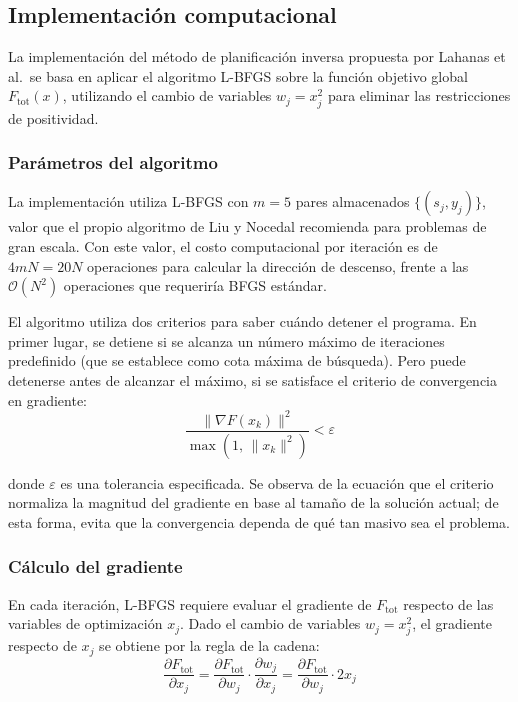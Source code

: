 \subsection{Implementación computacional}

La implementación del método de planificación inversa propuesta por Lahanas et al.\ se basa en aplicar el algoritmo L-BFGS sobre la función objetivo global \(F_{\text{tot}}(x)\), utilizando el cambio de variables \(w_j = x_j^2\) para eliminar las restricciones de positividad.

\subsubsection*{Parámetros del algoritmo}

La implementación utiliza L-BFGS con \(m = 5\) pares almacenados \(\{(s_j, y_j)\}\), valor que el propio algoritmo de Liu y Nocedal recomienda para problemas de gran escala. Con este valor, el costo computacional por iteración es de \(4mN = 20N\) operaciones para calcular la dirección de descenso, frente a las \(\mathcal{O}(N^2)\) operaciones que requeriría BFGS estándar.

El algoritmo utiliza dos criterios para saber cuándo detener el programa. En primer lugar, se detiene si se alcanza un número máximo de iteraciones predefinido (que se establece como cota máxima de búsqueda). Pero puede detenerse antes de alcanzar el máximo, si se satisface el criterio de convergencia en gradiente:
\[
\frac{\|\nabla F(x_k)\|^2}{\max(1,\,\|x_k\|^2)}
<
\varepsilon
\]

donde \(\varepsilon\) es una tolerancia especificada. Se observa de la ecuación que el criterio normaliza la magnitud del gradiente en base al tamaño de la solución actual; de esta forma, evita que la convergencia dependa de qué tan masivo sea el problema.

\subsubsection*{Cálculo del gradiente}
 
En cada iteración, L-BFGS requiere evaluar el gradiente de \(F_{\text{tot}}\) respecto de las variables de optimización \(x_j\). Dado el cambio de variables \(w_j = x_j^2\), el gradiente respecto de \(x_j\) se obtiene por la regla de la cadena:
\[
\frac{\partial F_{\text{tot}}}{\partial x_j}
=
\frac{\partial F_{\text{tot}}}{\partial w_j}
\cdot
\frac{\partial w_j}{\partial x_j}
=
\frac{\partial F_{\text{tot}}}{\partial w_j}
\cdot
2x_j
\]
 
